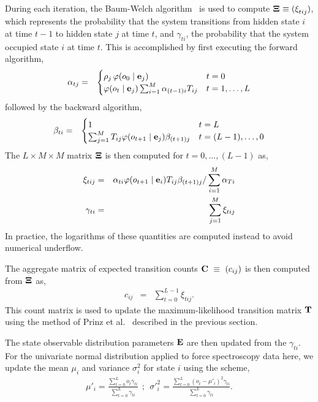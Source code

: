 \documentclass[aps,pre,twocolumn,superscriptaddress,nofootinbib,longbibliography]{revtex4-1}
\newcommand{\bfm}[1]{{\bf #1}}
\begin{document}
{During each iteration, the Baum-Welch algorithm~\cite{baum:1970:ann-math-statist:baum-welch} is used to compute $\bfm{\Xi}^{} \equiv (\xi^{}_{tij})$, which represents the probability that the system transitions from hidden state $i$ at time $t-1$ to hidden state $j$ at time $t$, and $\gamma^{}_{ti}$, the probability that the system occupied state $i$ at time $t$.
This is accomplished by first executing the forward algorithm,
\begin{eqnarray}
\alpha_{tj} &=& \begin{cases}
\rho_j \, \varphi(o_0 \mid \bfm{e}_j) & t = 0 \\
\varphi(o_t \mid \bfm{e}_j) \sum_{i=1}^M \alpha_{(t-1)i} T_{ij} & t = 1,\ldots,L
\end{cases}
\end{eqnarray}
followed by the backward algorithm,
\begin{eqnarray}
\beta_{ti} &=& \begin{cases}
1 & t = L \\
\sum_{j=1}^M T_{ij} \varphi(o_{t+1} \mid \bfm{e}_j) \beta_{(t+1)j} & t = (L-1),\ldots,0
\end{cases}
\end{eqnarray}
The $L \times M \times M$ matrix $\bfm{\Xi}$ is then computed for $t = 0,\ldots,(L-1)$ as,
\begin{eqnarray}
\xi_{tij} &=& \alpha_{ti} \varphi(o_{t+1} \mid \bfm{e}_i) T_{ij} \beta_{(t+1)j} / \sum_{i=1}^M \alpha_{Ti} \\
\gamma_{ti} &=& \sum_{j=1}^M \xi_{tij}
\end{eqnarray}
In practice, the logarithms of these quantities are computed instead to avoid numerical underflow.

The aggregate matrix of expected transition counts $\bfm{C}~\equiv~(c_{ij})$ is then computed from $\bfm{\Xi}^{}$ as,
\begin{eqnarray}
c_{ij} &=& \sum_{t=0}^{L^{}-1} \xi_{tij}^{} .
\end{eqnarray}
This count matrix is used to update the maximum-likelihood transition matrix $\bfm{T}$ using the method of Prinz et al.~\cite{noe:jcp:2011:msm-review} described in the previous section.

The state observable distribution parameters $\bfm{E}$ are then updated from the $\gamma_{ti}$.
For the univariate normal distribution applied to force spectroscopy data here, we update the mean $\mu_i$ and variance $\sigma^2_i$ for state $i$ using the scheme,
\begin{eqnarray}
\mu'_i = \frac{\sum\limits_{t=0}^{L} o^{}_{t} \gamma^{}_{ti}}{\sum\limits_{t=0}^{L^{}} \gamma^{}_{ti}} \:\:;\:\: {\sigma'}^2_i = \frac{\sum\limits_{t=0}^{L^{}} (o^{}_{t} - \mu'_i)^2 \gamma^{}_{ti}}{\sum\limits_{t=0}^{L^{}} \gamma^{}_{ti}} .
\end{eqnarray}

}
\end{document}
